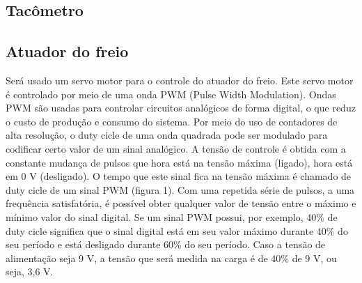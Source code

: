 \subsection{Tacômetro} %
\label{sub:tac_metro}





\subsection{Atuador do freio} %
\label{sub:atuador}

Será usado um servo motor para o controle do atuador do freio. Este servo motor é controlado por meio de uma onda PWM (Pulse Width Modulation). Ondas PWM são usadas para controlar circuitos analógicos de forma digital, o que reduz o custo de produção e consumo do sistema. Por meio do uso de contadores de alta resolução, o duty cicle de uma onda quadrada pode ser modulado para codificar certo valor de um sinal analógico. A tensão de controle é obtida com a constante mudança de pulsos que hora está na tensão máxima (ligado), hora está em 0 V (desligado). O tempo que este sinal fica na tensão máxima é chamado de duty cicle de um sinal PWM (figura 1). Com uma repetida série de pulsos, a uma frequência satisfatória, é possível obter qualquer valor de tensão entre o máximo e mínimo valor do sinal digital.
Se um sinal PWM possui, por exemplo, 40\% de duty cicle significa que o sinal digital está em seu valor máximo durante 40\% do seu período e está desligado durante 60\% do seu período. Caso a tensão de alimentação seja 9 V, a tensão que será medida na carga é de 40\% de 9 V, ou seja, 3,6 V.

